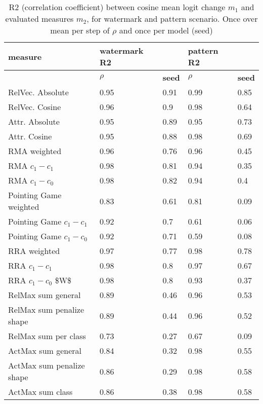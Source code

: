 \begin{table}[!ht]
    \centering
    \begin{tabular}{l|ll|ll}
    \hline
         \textbf{measure}& \textbf{watermark} R2 &  & \textbf{pattern} R2 &  \\ \hline
         & $\rho$ & \textbf{seed} & $\rho$  & \textbf{seed} \\ \hline
        RelVec. Absolute & 0.95 & 0.91 & 0.99 & 0.85 \\ \hline
        RelVec. Cosine & 0.96 & 0.9 & 0.98 & 0.64 \\ \hline
        Attr. Absolute & 0.95 & 0.89 & 0.95 & 0.73 \\ \hline
        Attr. Cosine & 0.95 & 0.88 & 0.98 & 0.69 \\ \hline
        RMA weighted & 0.96 & 0.76 & 0.96 & 0.45 \\ \hline
        RMA $c_1- c_1$ & 0.98 & 0.81 & 0.94 & 0.35 \\ \hline
        RMA $c_1- c_0$ & 0.98 & 0.82 & 0.94 & 0.4 \\ \hline
        Pointing Game weighted & 0.83 & 0.61 & 0.81 & 0.09 \\ \hline
        Pointing Game $c_1- c_1$ & 0.92 & 0.7 & 0.61 & 0.06 \\ \hline
        Pointing Game $c_1- c_0$ & 0.92 & 0.71 & 0.59 & 0.08 \\ \hline
        RRA weighted & 0.97 & 0.77 & 0.98 & 0.78 \\ \hline
        RRA $c_1- c_1$ & 0.98 & 0.8 & 0.97 & 0.67 \\ \hline
        RRA $c_1- c_0$ \$W\$ & 0.98 & 0.8 & 0.93 & 0.37 \\ \hline
        RelMax sum general & 0.89 & 0.46 & 0.96 & 0.53 \\ \hline
        RelMax sum penalize shape & 0.89 & 0.44 & 0.96 & 0.52 \\ \hline
        RelMax sum per class & 0.73 & 0.27 & 0.67 & 0.09 \\ \hline
        ActMax sum general & 0.84 & 0.32 & 0.98 & 0.55 \\ \hline
        ActMax sum penalize shape & 0.86 & 0.29 & 0.98 & 0.58 \\ \hline
        ActMax sum class & 0.86 & 0.38 & 0.98 & 0.58 \\ \hline
    \end{tabular}
    \caption{R2 (correlation coefficient) between cosine mean logit change $m_1$ and evaluated measures $m_2$, for watermark and pattern scenario. Once over mean per step of $\rho$ and once per model (seed)}
\end{table}


